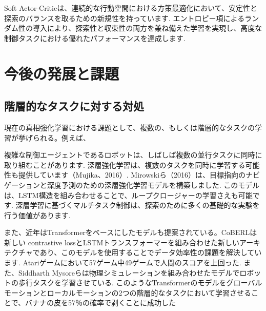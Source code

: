\documentclass[a4j, twocolumn, 10pt,pdflatex,ja=standard]{bxjsarticle}
\begin{document}
Soft
Actor-Criticは、連続的な行動空間における方策最適化において、安定性と探索のバランスを取るための新規性を持っています. エントロピー項によるランダム性の導入により、探索性と収束性の両方を兼ね備えた学習を実現し、高度な制御タスクにおける優れたパフォーマンスを達成します. 



\section{今後の発展と課題}

\subsection{階層的なタスクに対する対処}
現在の真相強化学習における課題として、複数の、もしくは階層的なタスクの学習が挙げられる。例えば、

複雑な制御エージェントであるロボットは、しばしば複数の並行タスクに同時に取り組むことがあります. 深層強化学習は、複数のタスクを同時に学習する可能性も提供しています（Mujika、2016）. Mirowskiら（2016）は、目標指向のナビゲーションと深度予測のための深層強化学習モデルを構築しました. このモデルは、LSTM構造を組み合わせることで、ループクロージャーの学習さえも可能です. 深層学習に基づくマルチタスク制御は、探索のために多くの基礎的な実験を行う価値があります. 

また、近年はTransformerをベースにしたモデルも提案されている。CoBERLは新しい contrastive lossとLSTMトランスフォーマーを組み合わせた新しいアーキテクチャであり、このモデルを使用することでデータ効率性の課題を解決しています. Atariゲームにおいて57ゲーム中49ゲームで人間のスコアを上回った.  また、Siddharth Mysoreらは物理シミュレーションを組み合わせたモデルでロボットの歩行タスクを学習させている\cite{regularizing}. このようなTransformerのモデルをグローバルモーションとローカルモーションの2つの階層的なタスクにおいて学習させることで、バナナの皮を57％の確率で剥くことに成功した\cite{banana}
\end{document}
